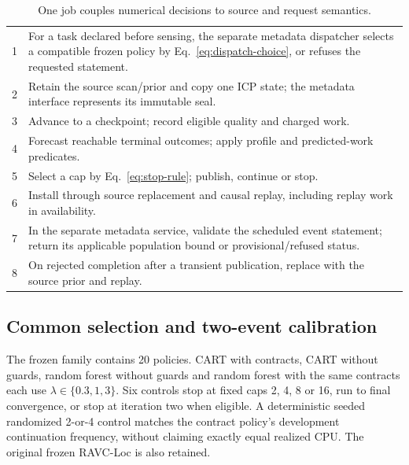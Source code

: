 \begin{table}[t]\centering\small
\caption{One job couples numerical decisions to source and request semantics.}\label{tab:algorithm}
\begin{tabularx}{\linewidth}{@{}rX@{}}\toprule
1 & For a task declared before sensing, the separate metadata dispatcher selects a compatible frozen policy by Eq.~\eqref{eq:dispatch-choice}, or refuses the requested statement.\\
2 & Retain the source scan/prior and copy one ICP state; the metadata interface represents its immutable seal.\\
3 & Advance to a checkpoint; record eligible quality and charged work.\\
4 & Forecast reachable terminal outcomes; apply profile and predicted-work predicates.\\
5 & Select a cap by Eq.~\eqref{eq:stop-rule}; publish, continue or stop.\\
6 & Install through source replacement and causal replay, including replay work in availability.\\
7 & In the separate metadata service, validate the scheduled event statement; return its applicable population bound or provisional/refused status.\\
8 & On rejected completion after a transient publication, replace with the source prior and replay.\\\bottomrule
\end{tabularx}
\end{table}

\subsection{Common selection and two-event calibration}
The frozen family contains 20 policies. CART with contracts, CART without guards, random forest without guards and random forest with the same contracts each use $\lambda\in\{0.3,1,3\}$. Six controls stop at fixed caps 2, 4, 8 or 16, run to final convergence, or stop at iteration two when eligible. A deterministic seeded randomized 2-or-4 control matches the contract policy's development continuation frequency, without claiming exactly equal realized CPU. The original frozen RAVC-Loc is also retained.

